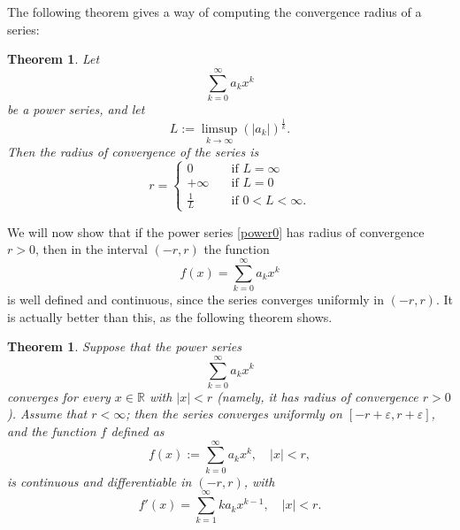 \documentclass[a4paper,reqno]{amsart}
\numberwithin{equation}{section}
\newtheorem{theorem}[definition]{Theorem}
\def\R{\mathbb{R}}
\begin{document}
The following theorem gives a way of computing the convergence radius of a series:

\begin{theorem}
Let
$$
\sum_{k=0}^\infty a_k x^k
$$
be a power series, and let 
$$
L:= \limsup_{k\to \infty} (|a_k|)^{\frac1k}.
$$
Then the radius of convergence of the series is 
$$
r = 
\begin{cases}
0 \quad &\textrm{if } L=\infty\\
+\infty \quad &\textrm{if } L=0\\
\frac1L \quad &\textrm{if } 0<L<\infty.
\end{cases}
$$
\end{theorem}



We will now show that if the power series \eqref{power0} has radius of convergence $r>0$, then in the interval $(-r,r)$ the function 
$$
f(x) = \sum_{k=0}^\infty a_k x^k
$$
is well defined and continuous, since the series converges uniformly in $(-r,r)$. It is actually better than this, as the following theorem shows.




\begin{theorem}\label{power:deriv}
Suppose that the power series 
$$
\sum_{k=0}^\infty a_k x^k
$$
converges for every $x\in \R$ with $|x|< r$ (namely, it has radius of convergence $r>0$). Assume that $r<\infty$; then the series converges uniformly on $[-r+\varepsilon, r+\varepsilon]$, and the function $f$ defined as
$$
f(x):=\sum_{k=0}^\infty a_k x^k, \quad |x|<r,
$$
is continuous and differentiable in $(-r,r)$, with
$$
f'(x) = \sum_{k=1}^\infty k a_k x^{k-1}, \quad |x|<r.
$$
\end{theorem}
\end{document}
